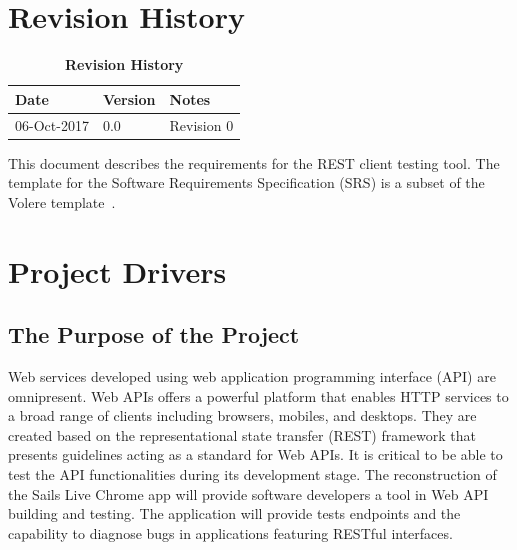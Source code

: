 \documentclass[12pt, titlepage]{article}
\newcommand{\revisionTable}{
	\begin{table}[hp]
		\caption{\bf Revision History}
		\begin{tabularx}{\textwidth}{p{3cm}p{2cm}X}
			\toprule {\bf Date} & {\bf Version} & {\bf Notes}\\
			\midrule
			
			06-Oct-2017 & 0.0 & Revision 0\\
			
			\bottomrule
		\end{tabularx}
	\end{table}
}
\begin{document}






\def\thesection{\arabic{section}} 
\renewcommand\thesection{\arabic{section}} 
\renewcommand\thesubsection{\thesection.\arabic{subsection}}

\tableofcontents

\listoftables

\listoffigures


\newpage

\section{Revision History}
\revisionTable

This document describes the requirements for the REST client testing tool. The template for the Software
Requirements Specification (SRS) is a subset of the Volere template~\citep{RobertsonAndRobertson2012}.

\section{Project Drivers}



\subsection{The Purpose of the Project}
Web services developed using web application programming interface (API) are omnipresent. Web APIs offers a powerful platform that enables HTTP services to a broad range of clients including browsers, mobiles, and desktops. They are created based on the representational state transfer (REST) framework that presents guidelines acting as a standard for Web APIs. It is critical to be able to test the API functionalities during its development stage. The reconstruction of the Sails Live Chrome app will provide software developers a tool in Web API building and testing. The application will provide tests endpoints and the capability to diagnose bugs in applications featuring RESTful interfaces.
\end{document}
